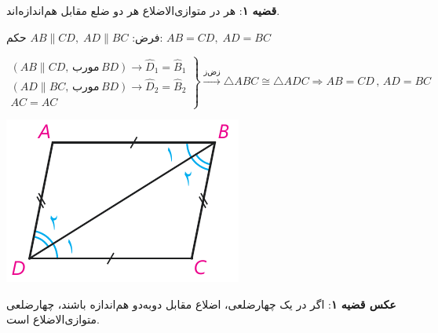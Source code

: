 \documentclass[12pt, a4paper, twoside]{book}
\begin{document}
\textbf{قضیه ۱}: هر در متوازی‌الاضلاع هر دو ضلع مقابل هم‌اندازه‌اند.

\begin{minipage}{.7\textwidth}
		\centering فرض: 
		$AB \parallel CD, \; AD \parallel BC$
		\qquad حکم:
		$AB = CD, \; AD = BC$
	\begin{flushleft}
			$ \left. \begin{array}{rll}
		(AB \parallel CD, \, \text{مورب} \, BD ) \rightarrow \widehat{D}_1 = \widehat{B}_1 \\ (AD \parallel BC, \, \text{مورب} \, BD ) \rightarrow \widehat{D}_2 = \widehat{B}_2 \\ AC =AC
		\end{array} \right\} \xrightarrow{\text{زض‌ز}} \triangle ABC \cong  \triangle ADC 
		\Rightarrow AB = CD \, , \, AD = BC$
	\end{flushleft}
\end{minipage}
\begin{minipage}{.28\textwidth}
	\begin{flushleft}
		\includegraphics{"Shapes/Fasl - 3/Dars 1/qazie 1.pdf"}
	\end{flushleft}
\end{minipage}
\newline \bigskip \bigskip

\textbf{عکس قضیه ۱}: اگر در یک چهارضلعی، اضلاع مقابل دوبه‌دو هم‌اندازه باشند، چهارضلعی متوازی‌الاضلاع است.
\end{document}
